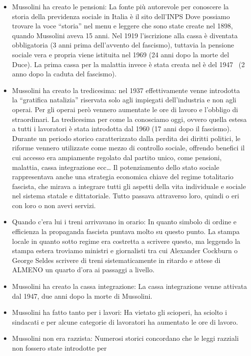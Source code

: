 \documentclass[12pt]{book} %
\begin{document}
\begin{mdframed}[linewidth=1pt]
\begin{itemize}
\item Mussolini ha creato le pensioni: La fonte più autorevole per conoscere la storia della previdenza sociale in
Italia è il sito dell'INPS Dove possiamo trovare la voce “storia”
nel menu e leggere che sono state create nel 1898, quando Mussolini aveva 15 anni. Nel 1919
l'iscrizione alla cassa è diventata obbligatoria (3 anni prima dell'avvento
del fascismo), tuttavia la pensione sociale vera e propria viene istituita nel 1969 (24 anni dopo la morte del Duce).
La prima cassa per la malattia invece è stata creata nel è del 1947 \ (2 anno dopo la caduta del fascismo).
\item Mussolini ha creato la tredicesima: nel 1937 effettivamente venne introdotta la “gratifica natalizia” riservata
solo agli impiegati dell'industria e non agli operai. Per gli operai però vennero aumentate le ore
di lavoro e l'obbligo di straordinari. La tredicesima per come la conosciamo oggi, ovvero quella
estesa a tutti i lavoratori è stata introdotta dal 1960 (17 anni dopo il fascismo).
Durante un periodo storico caratterizzato dalla perdita dei diritti politici, le riforme vennero utilizzate come mezzo di controllo sociale, offrendo benefici il cui accesso era ampiamente regolato dal partito unico, come pensioni, malattia, cassa integrazione ecc… Il potenziamento dello stato sociale rappresentava anche una strategia economica chiave del regime totalitario fascista, che mirava a integrare tutti gli aspetti della vita individuale e sociale nel sistema statale e dittatoriale. Tutto passava attraverso loro, quindi o eri con loro o non avevi servizi.
\item Quando c'era lui i treni arrivavano in orario: In quanto simbolo di ordine e efficienza la
propaganda fascista puntava molto su questo punto. La stampa locale in quanto sotto regime era costretta a scrivere
questo, ma leggendo la stampa estera troviamo ministri e giornalisti tra cui Alexander Cockburn o George Seldes
scrivere di treni sistematicamente in ritardo e attese di ALMENO un quarto d'ora ai passaggi a
livello.
\item Mussolini ha creato la cassa integrazione: La cassa integrazione venne attivata dal 1947, due anni dopo la morte
di Mussolini.
\item Mussolini ha fatto tanto per i lavori: Ha vietato gli scioperi, ha sciolto i sindacati e per alcune categorie di
lavoratori ha aumentato le ore di lavoro.
\item Mussolini non era razzista: Numerosi storici concordano che le leggi razziali non fossero state introdotte per

\end{itemize}
\end{mdframed}
\end{document}
